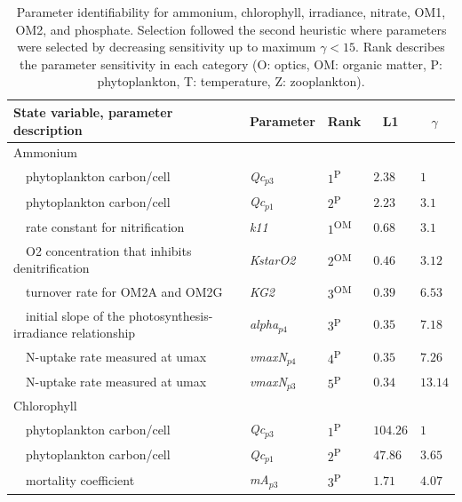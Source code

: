 \documentclass[letterpaper,12pt,oneside]{article}\usepackage[]{graphicx}\usepackage[]{color}
\begin{document}
\begin{table}[!tbp]
{\footnotesize
\caption{Parameter identifiability for ammonium, chlorophyll, irradiance, nitrate, OM1, OM2, and phosphate.  Selection followed the second heuristic where parameters were selected by decreasing sensitivity up to maximum $\gamma < 15$.  Rank describes the parameter sensitivity in each category (O: optics, OM: organic matter, P: phytoplankton, T: temperature, Z: zooplankton).\label{tab:identall2}} 
\begin{center}
\begin{tabular}{lllll}
\hline\hline
\multicolumn{1}{l}{State variable, parameter description}&\multicolumn{1}{c}{Parameter}&\multicolumn{1}{c}{Rank}&\multicolumn{1}{c}{L1}&\multicolumn{1}{c}{$\gamma$}\tabularnewline
\hline
{Ammonium}&&&&\tabularnewline
~~\scriptsize{phytoplankton carbon/cell}&\scriptsize{\textit{Qc$_{p3}$}}&$1$\textsuperscript{P}&$2.38$&$1$\tabularnewline
~~\scriptsize{phytoplankton carbon/cell}&\scriptsize{\textit{Qc$_{p1}$}}&$2$\textsuperscript{P}&$2.23$&$3.1$\tabularnewline
~~\scriptsize{rate constant for nitrification}&\scriptsize{\textit{k11}}&$1$\textsuperscript{OM}&$0.68$&$3.1$\tabularnewline
~~\scriptsize{O2 concentration that inhibits denitrification}&\scriptsize{\textit{KstarO2}}&$2$\textsuperscript{OM}&$0.46$&$3.12$\tabularnewline
~~\scriptsize{turnover rate for OM2A and OM2G}&\scriptsize{\textit{KG2}}&$3$\textsuperscript{OM}&$0.39$&$6.53$\tabularnewline
~~\scriptsize{initial slope of the photosynthesis-irradiance relationship}&\scriptsize{\textit{alpha$_{p4}$}}&$3$\textsuperscript{P}&$0.35$&$7.18$\tabularnewline
~~\scriptsize{N-uptake rate measured at umax}&\scriptsize{\textit{vmaxN$_{p4}$}}&$4$\textsuperscript{P}&$0.35$&$7.26$\tabularnewline
~~\scriptsize{N-uptake rate measured at umax}&\scriptsize{\textit{vmaxN$_{p3}$}}&$5$\textsuperscript{P}&$0.34$&$13.14$\tabularnewline
\hline
{Chlorophyll}&&&&\tabularnewline
~~\scriptsize{phytoplankton carbon/cell}&\scriptsize{\textit{Qc$_{p3}$}}&$1$\textsuperscript{P}&$104.26$&$1$\tabularnewline
~~\scriptsize{phytoplankton carbon/cell}&\scriptsize{\textit{Qc$_{p1}$}}&$2$\textsuperscript{P}&$47.86$&$3.65$\tabularnewline
~~\scriptsize{mortality coefficient}&\scriptsize{\textit{mA$_{p3}$}}&$3$\textsuperscript{P}&$1.71$&$4.07$\tabularnewline

\end{tabular}
\end{center}}
\end{table}
\end{document}
